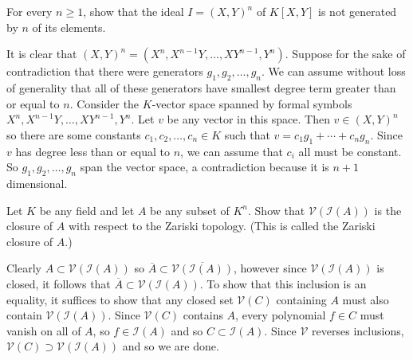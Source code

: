 \documentclass[11pt,letterpaper]{article}
\begin{document}
\begin{problem}
  For every $n\geq1$, show that the ideal $I=(X,Y)^n$ of $K[X,Y]$ is not generated by $n$ of its elements.
\end{problem}

\begin{solution}
    It is clear that $(X,Y)^n=(X^n, X^{n-1}Y, \ldots, XY^{n-1}, Y^n)$. Suppose for the sake of contradiction that there were generators $g_1,g_2,\ldots,g_n$. We can assume without loss of generality that all of these generators have smallest degree term greater than or equal to $n$. Consider the $K$-vector space spanned by formal symbols $X^n, X^{n-1}Y, \ldots, XY^{n-1}, Y^n$. Let $v$ be any vector in this space. Then $v\in (X,Y)^n$ so there are some constants $c_1,c_2,\ldots,c_n\in K$ such that $v=c_1 g_1+\cdots+c_n g_n$. Since $v$ has degree less than or equal to $n$, we can assume that $c_i$ all must be constant. So $g_1,g_2,\ldots,g_n$ span the vector space, a contradiction because it is $n+1$ dimensional.  
\end{solution}

\begin{problem}
  Let $K$ be any field and let $A$ be any subset of $K^n$. Show that $\mathcal V(\mathcal I(A))$ is the closure of $A$ with respect to the Zariski topology. (This is called the Zariski closure of $A$.) 
\end{problem}

\begin{changemargin}{1em}{1em}
  Clearly $A\subset \mathcal{V}(\mathcal{I}(A))$ so $\overline{A} \subset \overline{\mathcal{V}(\mathcal{I}(A))}$, however since $\mathcal{V}(\mathcal{I}(A))$ is closed, it follows that $\overline{A} \subset \mathcal{V}(\mathcal{I}(A))$. To show that this inclusion is an equality, it suffices to show that any closed set $\mathcal{V}(C)$ containing $A$ must also contain $\mathcal{V}(\mathcal{I}(A))$. Since $\mathcal{V}(C)$ contains $A$, every polynomial $f\in C$ must vanish on all of $A$, so $f\in \mathcal{I}(A)$ and so $C\subset \mathcal{I}(A)$. Since $\mathcal{V}$ reverses inclusions, $\mathcal{V}(C)\supset \mathcal{V}(\mathcal{I}(A))$ and so we are done.   
\end{changemargin}
\end{document}
